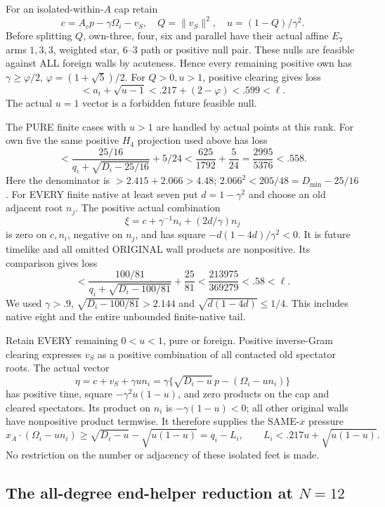 \documentclass[11pt]{article}
\begin{document}
For an isolated-within-\(A\) cap retain
\[
 c=A_cp-\gamma\Omega_i-v_S,\quad
 Q=\|v_S\|^2,\quad u=(1-Q)/\gamma^2 .
\]
Before splitting \(Q\), own-three, four, six
and parallel have their actual affine
\(E_7\) arms \(1,3,3\), weighted star,
\(6\)--\(3\) path or positive null pair.
These nulls are feasible against ALL foreign
walls by acuteness.
Hence every remaining positive own has
\(\gamma\ge\varphi/2\), \(\varphi=(1+\sqrt5)/2\).
For \(Q>0,u>1\), positive clearing gives loss
\[
 <a_i+\sqrt{u-1}<.217+(2-\varphi)<.599<\ell.
\]
The actual \(u=1\) vector is a forbidden
future feasible null.

The PURE finite cases with \(u>1\) are
handled by actual points at this rank.
For own five the same positive \(H_4\)
projection used above has loss
\[
 <{\frac{25/16}{q_i+\sqrt{D_i-25/16}}}+5/24
 <{\frac{625}{1792}}+{\frac{5}{24}}
 ={\frac{2995}{5376}}<.558.
\]
Here the denominator is \(>2.415+2.066>4.48\);
\(2.066^2<205/48=D_{\min}-25/16\).
For EVERY finite native at least seven put
\(d=1-\gamma^2\) and choose an old adjacent
root \(n_j\).  The positive actual combination
\[
 \xi=c+\gamma^{-1}n_i+(2d/\gamma)n_j
\]
is zero on \(c,n_i\), negative on \(n_j\),
and has square \(-d(1-4d)/\gamma^2<0\).
It is future timelike and all omitted
ORIGINAL wall products are nonpositive.
Its comparison gives loss
\[
 <{\frac{100/81}{q_i+\sqrt{D_i-100/81}}}
                   +{\frac{25}{81}}
 <{\frac{213975}{369279}}<.58<\ell.
\]
We used \(\gamma>.9\),
\(\sqrt{D_i-100/81}>2.144\) and
\(\sqrt{d(1-4d)}\le1/4\).
This includes native eight and the entire
unbounded finite-native tail.

Retain EVERY remaining \(0<u<1\), pure or
foreign.  Positive inverse-Gram clearing
expresses \(v_S\) as a positive combination
of all contacted old spectator roots.
The actual vector
\[
 \eta=c+v_S+\gamma un_i
   =\gamma\{\sqrt{D_i-u}\,p-(\Omega_i-un_i)\}
\]
has positive time, square
\(-\gamma^2u(1-u)\), and zero products on
the cap and cleared spectators.
Its product on \(n_i\) is
\(-\gamma(1-u)<0\); all other original
walls have nonpositive product termwise.
It therefore supplies the SAME-\(x\) pressure
\[
 x_A\cdot(\Omega_i-un_i)
       \ge\sqrt{D_i-u}-\sqrt{u(1-u)}
       =q_i-L_i,\qquad
 L_i<.217u+\sqrt{u(1-u)} .
\tag{A11foot}\label{eq:arithA11foot}
\]
No restriction on the number or adjacency
of these isolated feet is made.

\subsection[The all-degree end-helper reduction at N=12]{The all-degree end-helper reduction at \(N=12\)}
\label{app:arithA11helperfield}
\end{document}
